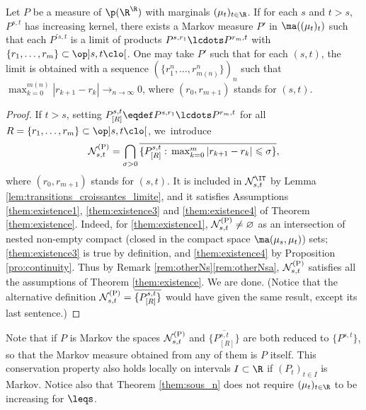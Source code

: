 \begin{them}[Markovinification]\label{them:sous_n}
Let $P$ be a measure of\/ $\p(\R^\R)$ with marginals $(\mu_t)_{t\in \R}$. If for each $s$ and $t>s$, $P^{s,t}$ has increasing kernel, there exists a Markov measure $P'$ in $\ma((\mu_t)_t)$ such that each $P^{\prime s,t}$ is a limit of products $P^{s,r_1}\lcdots P^{r_m,t}$ with $\{r_1,\ldots,r_m\}\subset\op]s,t\clo[$. One may take $P'$ such that for each $(s,t)$, the limit is obtained with a sequence $(\{r^n_1,\ldots,r^n_{m(n)}\})_n$ such that $\max_{k=0}^{m(n)} |r_{k+1}-r_k|\to_{n\to\infty}0$, where $(r_0,r_{m+1})$ stands for $(s,t)$.
\end{them}

\begin{proof} If $t>s$, setting $P_{[R]}^{s,t}\eqdef P^{s,r_1}\lcdots P^{r_m,t}$ for all $R=\{r_1,\ldots,r_m\}\subset\op]s,t\clo[$, we~introduce
\[
\mathcal{N}_{s,t}^{\rm (P)}=\bigcap_{\sigma>0}\overline{\{P_{[R]}^{s,t}:\,\max\nolimits_{k=0}^m |r_{k+1}-r_k|\leqslant\sigma\}},
\]
where $(r_0,r_{m+1})$ stands for $(s,t)$. It is included in $\mathcal{N}_{s,t}^\IT$ by Lemma \ref{lem:transitions_croissantes_limite}, and it satisfies Assumptions \eqref{them:existence1}, \eqref{them:existence3} and \eqref{them:existence4} of Theorem \ref{them:existence}. Indeed, for \eqref{them:existence1}, $\mathcal{N}_{s,t}^{\rm (P)}\neq\varnothing$ as an intersection of nested non-empty compact (closed in the compact space $\ma(\mu_s,\mu_t)$) sets; \eqref{them:existence3} is true by definition, and \eqref{them:existence4} by Proposition \ref{pro:continuity}. Thus by Remark \ref{rem:otherNs}\eqref{rem:otherNsa}, $\mathcal{N}_{s,t}^{\rm (P)}$ satisfies all the assumptions of Theorem \ref{them:existence}. We are done. (Notice that the alternative definition $\mathcal{N}_{s,t}^{\rm (P)}=\overline{\{P_{[R]}^{s,t}\}}$ would have given the same result, except its last sentence.)
\end{proof}

Note that if $P$ is Markov the spaces $\mathcal{N}_{s,t}^{\rm (P)}$ and $\overline{\{P_{[R]}^{s,t}\}}$ are both reduced to $\{P^{s,t}\}$, so that the Markov measure obtained from any of them is $P$ itself. This conservation property also holds locally on intervals $I\subset \R$ if $(P_t)_{t\in I}$ is Markov. Notice also that Theorem \ref{them:sous_n} does not require $(\mu_t)_{t\in\R}$ to be increasing for $\leqs $.

